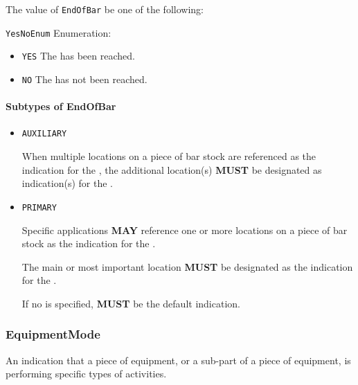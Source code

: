 The value of \texttt{EndOfBar} \MUST be one of the following: 


\texttt{YesNoEnum} Enumeration:

\begin{itemize}
\item \texttt{YES} \newline The  has been reached. 
\item \texttt{NO} \newline The  has not been reached. 
\end{itemize}


\paragraph{Subtypes of EndOfBar}\mbox{}
\label{sec:Subtypes of EndOfBar}

\begin{itemize}

\item \texttt{AUXILIARY}


When multiple locations on a piece of bar stock are referenced as the indication for the , the additional location(s) \textbf{MUST} be designated as  indication(s) for the .  

\item \texttt{PRIMARY}


Specific applications \textbf{MAY} reference one or more locations on a piece of bar stock as the indication for the . 

The main or most important location \textbf{MUST} be designated as the  indication for the .

If no  is specified,  \textbf{MUST} be the default  indication.


\end{itemize}





\subsubsection{EquipmentMode}
\label{sec:EquipmentMode}



An indication that a piece of equipment, or a sub-part of a piece of equipment, is performing specific types of activities.


